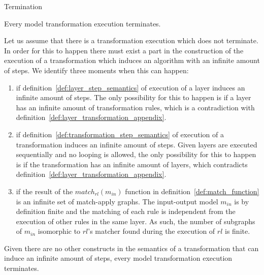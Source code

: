 \begin{proposition}{Termination}

Every model transformation execution terminates.
\end{proposition}
\begin{pf}
Let us assume that there is a transformation execution which does not terminate. In order for this to happen there must exist a part in the construction of the execution of a transformation which induces an algorithm with an infinite amount of steps. We identify three moments when this can happen:
\begin{enumerate}
\item if definition~\ref{def:layer_step_semantics} of execution of a layer induces an infinite amount of steps. The only possibility for this to happen is if a layer has an infinite amount of transformation rules, which is a contradiction with definition~\ref{def:layer_transformation_appendix}.
\item if definition~\ref{def:transformation_step_semantics} of execution of a transformation induces an infinite amount of steps. Given layers are executed sequentially and no looping is allowed, the only possibility for this to happen is if the transformation has an infinite amount of layers, which contradicts definition~\ref{def:layer_transformation_appendix}.
\item if the result of the $match_{rl}(m_{in})$ function in definition~\ref{def:match_function} is an infinite set of match-apply graphs. The input-output model $m_{in}$ is by definition finite and the matching of each rule is independent from the execution of other rules in the same layer. As such, the number of subgraphs of $m_{in}$ isomorphic to $rl$'s matcher found during the execution of $rl$ is finite.
\end{enumerate}
Given there are no other constructs in the semantics of a transformation that can induce an infinite amount of steps, every model transformation execution terminates.
\end{pf}

